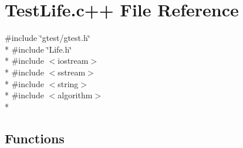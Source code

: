 \hypertarget{TestLife_8c_09_09}{\section{Test\-Life.\-c++ File Reference}
\label{TestLife_8c_09_09}
}
{\ttfamily \#include \char`\"{}gtest/gtest.\-h\char`\"{}}\\*
{\ttfamily \#include \char`\"{}Life.\-h\char`\"{}}\\*
{\ttfamily \#include $<$iostream$>$}\\*
{\ttfamily \#include $<$sstream$>$}\\*
{\ttfamily \#include $<$string$>$}\\*
{\ttfamily \#include $<$algorithm$>$}\\*
\subsection*{Functions}
